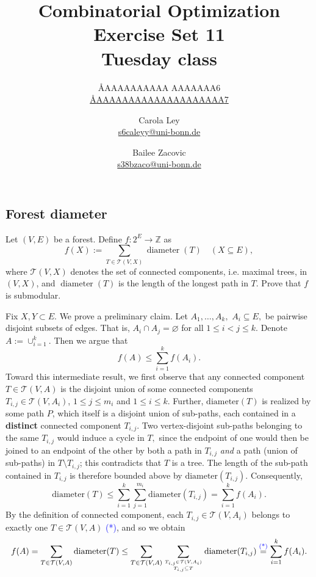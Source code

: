 \documentclass{article}
\title{Combinatorial Optimization \\ Exercise Set 11 \\ Tuesday class}
\author{
  \AA{AAAAAAAAAA AAAAAAA}{6} \\
  \href{mailto:\AA{AAAAAAAAAAAAAAAAAAAA}{7}}{\AA{AAAAAAAAAAAAAAAAAAAA}{7}}
  \and
  Carola Ley \\
  \href{mailto:s6caleyy@uni-bonn.de}{s6caleyy@uni-bonn.de}
  \and
  Bailee Zacovic \\
  \href{mailto:s38bzaco@uni-bonn.de}{s38bzaco@uni-bonn.de}
}
\let\emptyset\varnothing
\newcommand{\Z}{\mathbb{Z}}
\newcommand{\diameter}{\operatorname{diameter}}
\begin{document}
  \maketitle

  \setcounter{section}{11}
  \subsection{Forest diameter}
  \begin{centerframebox}
    Let $(V, E)$ be a forest. Define $f : 2^E \to \Z$ as
    \[ f(X) := \sum_{T \in \mathcal{T}(V,X) } \diameter(T) \quad (X\subseteq E), \]
    where $\mathcal{T}(V, X)$ denotes the set of connected components, i.e. maximal trees, in
    $(V, X)$, and $\diameter(T)$ is the length of the longest path in $T$. Prove that $f$ is
    submodular.
  \end{centerframebox}
  Fix $X,Y\subset E.$ We prove a preliminary claim. Let $A_1,\dots,A_k,$ $A_i\subseteq E,$ be pairwise disjoint subsets of edges. That is, $A_i\cap A_j=\emptyset$ for all $1\leq i<j\leq k.$ Denote $A:=\cup_{i=1}^k.$ Then we argue that\begin{equation}
       f\left(A\right)\leq \sum_{i=1}^k f(A_i).
  \end{equation}
  Toward this intermediate result, we first observe that any connected component $T\in \mathcal{T}(V,A)$ is the disjoint union of some connected components $T_{i,j}\in \mathcal{T}(V,A_i)$, $1\leq j\leq m_i$ and $1\leq i\leq k.$ Further, $\text{diameter}(T)$ is realized by some path $P$, which itself is a disjoint union of sub-paths, each contained in a \textbf{distinct} connected component $T_{i,j}$. Two vertex-disjoint sub-paths belonging to the same $T_{i,j}$ would induce a cycle in $T,$ since the endpoint of one would then be joined to an endpoint of the other by both a path in $T_{i,j}$ \textit{and} a path (union of sub-paths) in $T\setminus T_{i,j}$; this contradicts that $T$ is a tree. The length of the sub-path contained in $T_{i,j}$ is therefore bounded above by $\text{diameter}(T_{i,j}).$ Consequently,
  $$\text{diameter}(T)\leq \sum_{i=1}^k \sum_{j=1}^{m_i}\text{diameter}(T_{i,j})=\sum_{i=1}^k f(A_i).$$By the definition of connected component, each $T_{i,j}\in \mathcal{T}(V,A_i)$ belongs to exactly one $T\in \mathcal{T}(V,A)$ \textcolor{blue}{(*)}, and so we obtain
  $$f(A)=\sum_{T\in \mathcal{T}(V,A)} \text{diameter}(T)\leq \sum_{T\in \mathcal{T}(V,A)}\sum_{T_{i,j}\in \mathcal{T}(V,A_i)\atop T_{i,j}\subseteq T}\text{diameter}(T_{i,j})\overset{\text{\textcolor{blue}{(*)}}}{=}\sum_{i=1}^k f(A_i).$$
\end{document}
